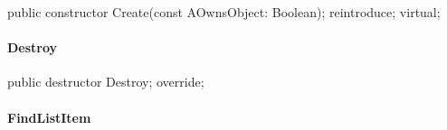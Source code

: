 \documentclass{report}
\newif\ifpdf
\begin{document}
\label{PasDoc_Items.TBaseItems-Create}
\begin{list}{}{
\setlength{\itemindent}{0cm}
\setlength{\listparindent}{0cm}
\setlength{\leftmargin}{\evensidemargin}
\addtolength{\leftmargin}{\tmplength}
\settowidth{\labelsep}{X}
\addtolength{\leftmargin}{\labelsep}
\setlength{\labelwidth}{\tmplength}
}
\item[\textbf{Declaration}\hfill]
\ifpdf
\begin{flushleft}
\fi
\begin{ttfamily}
public constructor Create(const AOwnsObject: Boolean); reintroduce; virtual;\end{ttfamily}

\ifpdf
\end{flushleft}
\fi

\end{list}
\paragraph*{Destroy}\hspace*{\fill}

\label{PasDoc_Items.TBaseItems-Destroy}
\begin{list}{}{
\setlength{\itemindent}{0cm}
\setlength{\listparindent}{0cm}
\setlength{\leftmargin}{\evensidemargin}
\addtolength{\leftmargin}{\tmplength}
\settowidth{\labelsep}{X}
\addtolength{\leftmargin}{\labelsep}
\setlength{\labelwidth}{\tmplength}
}
\item[\textbf{Declaration}\hfill]
\ifpdf
\begin{flushleft}
\fi
\begin{ttfamily}
public destructor Destroy; override;\end{ttfamily}

\ifpdf
\end{flushleft}
\fi

\end{list}
\paragraph*{FindListItem}\hspace*{\fill}
\end{document}
